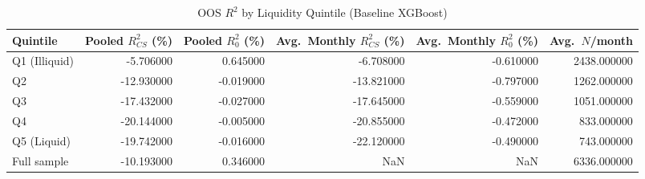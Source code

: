 \begin{table}
\caption{OOS $R^2$ by Liquidity Quintile (Baseline XGBoost)}
\label{tab:r2_by_quintile_ml}
\begin{tabular}{lrrrrr}
\toprule
Quintile & Pooled $R^2_{CS}$ (\%) & Pooled $R^2_{0}$ (\%) & Avg.\ Monthly $R^2_{CS}$ (\%) & Avg.\ Monthly $R^2_{0}$ (\%) & Avg.\ $N$/month \\
\midrule
Q1 (Illiquid) & -5.706000 & 0.645000 & -6.708000 & -0.610000 & 2438.000000 \\
Q2 & -12.930000 & -0.019000 & -13.821000 & -0.797000 & 1262.000000 \\
Q3 & -17.432000 & -0.027000 & -17.645000 & -0.559000 & 1051.000000 \\
Q4 & -20.144000 & -0.005000 & -20.855000 & -0.472000 & 833.000000 \\
Q5 (Liquid) & -19.742000 & -0.016000 & -22.120000 & -0.490000 & 743.000000 \\
Full sample & -10.193000 & 0.346000 & NaN & NaN & 6336.000000 \\
\bottomrule
\end{tabular}
\end{table}
